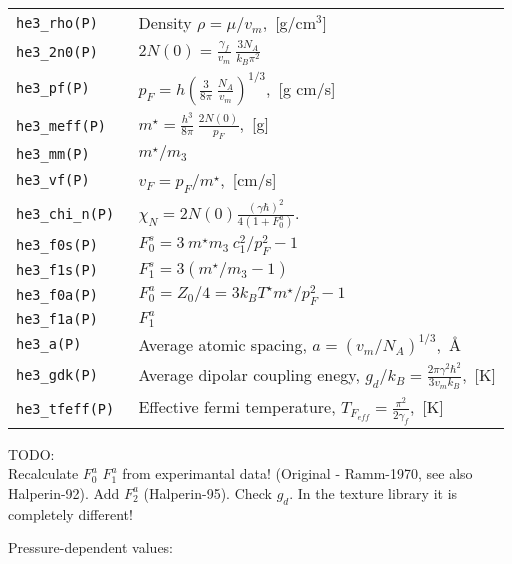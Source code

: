 \documentclass[a4paper]{article}
\begin{document}
\medskip
\noindent\begin{tabular}{lp{12.5cm}}
\tt he3\_rho(P)    & Density $\rho = \mu/v_m$,~[g/cm$^3$]\\
\tt he3\_2n0(P)    & $\displaystyle 2N(0) = \frac{\gamma_f}{v_m}
                     \ \frac{3 N_A}{k_B \pi^2}$\\
\tt he3\_pf(P)     & $\displaystyle p_F = h \left(\frac{3}{8\pi}
                     \ \frac{N_A}{v_m}\right)^{1/3}$,~[g cm/s]\\
\tt he3\_meff(P)   & $\displaystyle m^\star = \frac{h^3}{8\pi}
                     \ \frac{2N(0)}{p_F}$,~[g]\\
\tt he3\_mm(P)     &$m^\star/m_3$\\
\tt he3\_vf(P)     &$\displaystyle v_F = p_F/m^\star$,~[cm/s]\\
\tt he3\_chi\_n(P) &$\displaystyle \chi_{N} = 2N(0) \frac{(\gamma\hbar)^2}{4(1 + F_0^a)}$.\\
\tt he3\_f0s(P)    &$\displaystyle F_0^s = 3\ m^\star m_3\ c_1^2 / p_F^2 - 1$\\
\tt he3\_f1s(P)    &$\displaystyle F_1^s = 3(m^\star/m_3 - 1)$\\
\tt he3\_f0a(P)    &$\displaystyle F_0^a = Z_0/4 = 3 k_B T^\star m^\star / p_F^2 - 1$\\
\tt he3\_f1a(P)    &$\displaystyle F_1^a$\\

\tt he3\_a(P)      &Average atomic spacing,
                    $\displaystyle a=(v_m/N_A)^{1/3}$,~\AA\\
\tt he3\_gdk(P)    &Average dipolar coupling enegy,
                    $\displaystyle g_d/k_B = \frac{2\pi\gamma^2\hbar^2}{3 v_m k_B}$,~[K]\\
\tt he3\_tfeff(P)  &Effective fermi temperature,
                    $\displaystyle T_{F_{eff}} = \frac{\pi^2}{2\gamma_f}$,~[K]\\
\end{tabular}
\medskip

\noindent TODO:\\
Recalculate $F_0^a$ $F_1^a$ from experimantal data!
(Original - Ramm-1970, see also Halperin-92). Add $F_2^a$ (Halperin-95). 
Check $g_d$. In the texture library it is completely different!

\eject
Pressure-dependent values:
\medskip

{\small}

\eject
\end{document}
